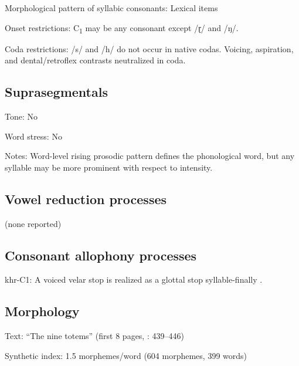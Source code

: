 {\begin{appendixdesc}
\item[Morphological pattern of syllabic consonants:] Lexical items

\item[Onset restrictions:] C\textsubscript{1} may be any consonant except /ɽ/ and /ŋ/.

\item[Coda restrictions:] /s/ and /h/ do not occur in native codas. Voicing, aspiration, and dental/retroflex contrasts neutralized in coda.
\end{appendixdesc}
\subsection*{Suprasegmentals}
\begin{appendixdesc}
\item[Tone:] No

\item[Word stress:] No

\item[Notes:] Word-level rising prosodic pattern defines the phonological word, but any syllable may be more prominent with respect to intensity.
\end{appendixdesc}
\subsection*{Vowel reduction processes}

(none reported)

\subsection*{Consonant allophony processes}
\begin{appendixdesc}

\item[khr-C1:] A voiced velar stop is realized as a glottal stop syllable-finally \citep[29]{Peterson2011}.
\end{appendixdesc}
\subsection*{Morphology}

\begin{appendixdesc}

\item[Text:] “The nine totems” (first 8 pages, \citealt{Peterson2011}: 439--446)

\item[Synthetic index:] 1.5 morphemes/word (604 morphemes, 399 words)
\end{appendixdesc}
}
